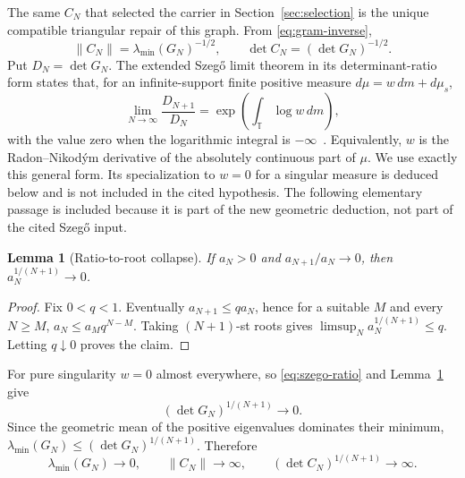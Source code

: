\documentclass[11pt]{article}
\newtheorem{lemma}[theorem]{Lemma}
\newcommand{\T}{\mathbb T}
\begin{document}
The same $C_N$ that selected the carrier in Section~\ref{sec:selection} is the unique compatible
triangular repair of this graph.  From \eqref{eq:gram-inverse},
\begin{equation}\label{eq:norm-law}
  \|C_N\|=\lambda_{\min}(G_N)^{-1/2},
  \qquad
  \det C_N=(\det G_N)^{-1/2}.
\end{equation}
Put $D_N=\det G_N$.  The extended Szeg\H{o} limit theorem in its determinant-ratio form
states that, for an infinite-support finite positive measure
$d\mu=w\,dm+d\mu_s$,
\begin{equation}\label{eq:szego-ratio}
  \lim_{N\to\infty}\frac{D_{N+1}}{D_N}
  =\exp\left(\int_{\T}\log w\,dm\right),
\end{equation}
with the value zero when the logarithmic integral is $-\infty$~\cite[Theorem~1]{Lyons2003}.
Equivalently, $w$ is the Radon--Nikod\'ym derivative of the absolutely continuous part of $\mu$.
We use exactly this general form.  Its specialization to $w=0$ for a singular measure is deduced
below and is not included in the cited hypothesis.
The following elementary passage is included because it is part of the new geometric deduction,
not part of the cited Szeg\H{o} input.

\begin{lemma}[Ratio-to-root collapse]\label{lem:ratio-root}
If $a_N>0$ and $a_{N+1}/a_N\to0$, then
$a_N^{1/(N+1)}\to0$.
\end{lemma}

\begin{proof}
Fix $0<q<1$.  Eventually $a_{N+1}\leq q a_N$, hence for a suitable $M$ and every $N\geq M$,
$a_N\leq a_Mq^{N-M}$.  Taking $(N+1)$-st roots gives
$\limsup_N a_N^{1/(N+1)}\leq q$.  Letting $q\downarrow0$ proves the claim.
\end{proof}

For pure singularity $w=0$ almost everywhere, so \eqref{eq:szego-ratio} and
Lemma~\ref{lem:ratio-root} give
\begin{equation}\label{eq:szego}
  (\det G_N)^{1/(N+1)}\longrightarrow0.
\end{equation}
Since the geometric mean of the positive eigenvalues dominates their minimum,
$\lambda_{\min}(G_N)\leq(\det G_N)^{1/(N+1)}$.  Therefore
\begin{equation}\label{eq:divergence}
  \lambda_{\min}(G_N)\longrightarrow0,\qquad
  \|C_N\|\longrightarrow\infty,\qquad
  (\det C_N)^{1/(N+1)}\longrightarrow\infty.
\end{equation}
\end{document}
